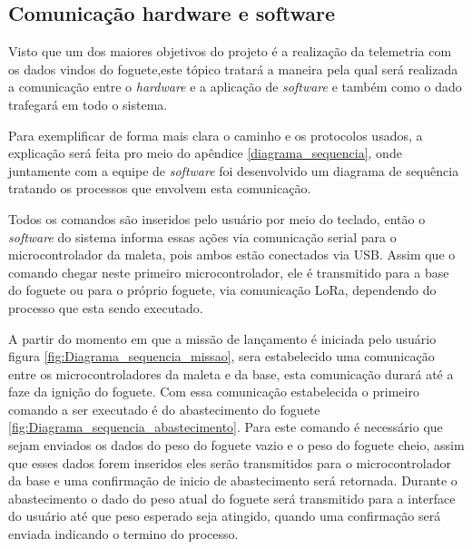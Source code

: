 \subsection{Comunicação hardware e software}

\par Visto que um dos maiores objetivos do projeto é a realização da telemetria com os dados vindos do foguete,este tópico tratará a maneira pela qual será realizada a comunicação entre o \textit{hardware} e a aplicação de \textit{software} e também como o dado trafegará em todo o sistema.

\par Para exemplificar de forma mais clara o caminho e os protocolos usados, a explicação será feita pro meio do apêndice \ref{diagrama_sequencia}, onde juntamente com a equipe de \textit{software} foi desenvolvido um diagrama de sequência tratando os processos que envolvem esta comunicação.



\par Todos os comandos são inseridos pelo usuário por meio do teclado, então o \textit{software} do sistema informa essas ações via comunicação serial para o microcontrolador da maleta, pois ambos estão conectados via USB. Assim que o comando chegar neste primeiro microcontrolador, ele é transmitido para a base do foguete ou para o próprio foguete, via comunicação LoRa, dependendo do processo que esta sendo executado.

A partir do momento em que a missão de lançamento é iniciada pelo usuário figura \ref{fig:Diagrama_sequencia_missao}, sera estabelecido uma comunicação entre os microcontroladores da maleta e da base, esta comunicação durará até a faze da ignição do foguete. Com essa comunicação estabelecida o primeiro comando a ser executado é do abastecimento do foguete \ref{fig:Diagrama_sequencia_abastecimento}. Para este comando é necessário que sejam enviados os dados do peso do foguete vazio e o peso do foguete cheio, assim que esses dados forem inseridos eles serão transmitidos para o microcontrolador da base e uma confirmação de inicio de abastecimento será retornada. Durante o abastecimento o dado do peso atual do foguete será transmitido para a interface do usuário até que peso esperado seja atingido, quando uma confirmação será enviada indicando o termino do processo.


